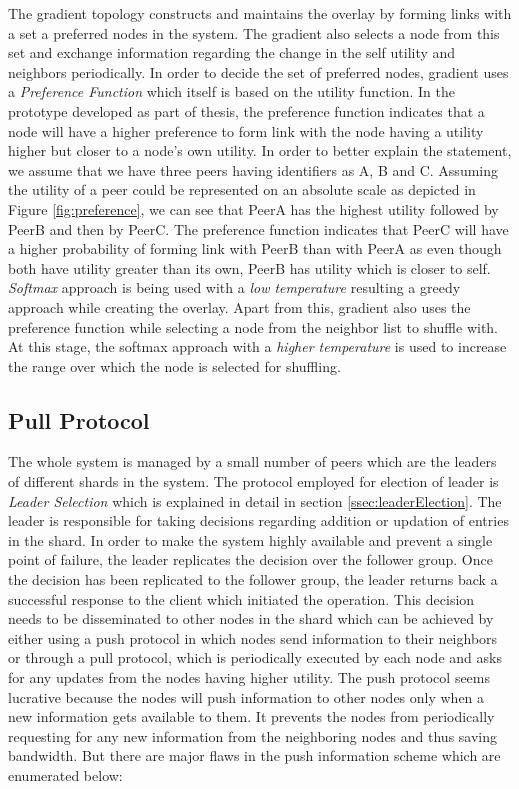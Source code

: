 \documentclass[12pt,a4paper,twoside,openright]{book}
\begin{document}
\par The gradient topology constructs and maintains the overlay by forming links with a set a preferred nodes in the system. The gradient also selects a node from this set and exchange information regarding the change in the self utility and neighbors periodically. In order to decide the set of preferred nodes, gradient uses a \textit{Preference Function} which itself is based on the utility function. In the prototype developed as part of thesis, the preference function indicates that a node will have a higher preference to form link with the node having a utility higher but closer to a node's own utility. In order to better explain the statement, we assume that we have three peers having identifiers as A, B and C. Assuming the utility of a peer could be represented on an absolute scale as depicted in Figure \ref{fig:preference}, we can see that PeerA has the highest utility  followed by PeerB and then by PeerC. The preference function indicates that PeerC will have a higher probability of forming link with PeerB than with PeerA as even though both have utility greater than its own, PeerB has utility which is closer to self. \textit{Softmax} approach is being used with a \textit{low temperature} resulting a greedy approach while creating the overlay. Apart from this, gradient also uses the  preference function while selecting a node from the neighbor list to shuffle with. At this stage, the softmax approach with a \textit{higher temperature} is used to increase the range over which the node is selected for shuffling. 


\subsection{Pull Protocol}

The whole system is managed by a small number of peers which are the leaders of different shards in the system. The protocol employed for election of leader is \textit{Leader Selection} which is explained in detail in section \ref{ssec:leaderElection}. The leader is responsible for taking decisions regarding addition or updation of entries in the shard. In order to make the system highly available and prevent a single point of failure, the leader replicates the decision over the follower group. Once the decision has been replicated to the follower group, the leader returns back a successful response to the client which initiated the operation. This decision needs to be disseminated to other nodes in the shard which can be achieved by either using a push protocol in which nodes send information to their neighbors or through a pull protocol, which is periodically executed by each node and asks for any updates from the nodes having higher utility. The push protocol seems lucrative because the nodes will push information to other nodes only when a new information gets available to them. It prevents the nodes from periodically requesting for any new information from the neighboring nodes and thus saving bandwidth. But there are major flaws in the push information scheme which are enumerated below:
\end{document}
